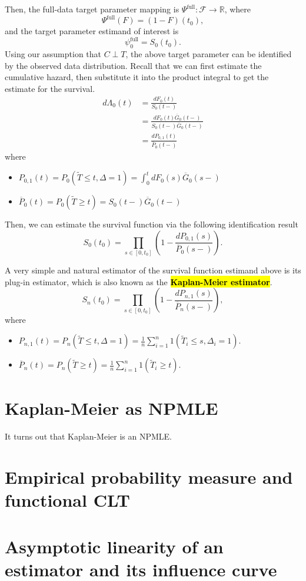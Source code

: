 \documentclass[12pt]{article}
\DeclareMathOperator{\1}{\mathds{1}}
\begin{document}
Then, the full-data target parameter mapping is $\Psi^\text{full}: \mathcal F \to \mathbb R$, where
\[
\Psi^\text{full}(F) = (1 - F)(t_0),
\]
and the target parameter estimand of interest is 
\[
\psi_0^\text{full} = S_0(t_0).
\]
Using our assumption that $C \perp T$, the above target parameter can be identified by the observed data distribution. Recall that we can first estimate the cumulative hazard, then substitute it into the product integral to get the estimate for the survival.
\begin{align*}
d\Lambda_0(t) &= \frac{dF_0(t)}{S_0(t-)} \\
&= \frac{dF_0(t) \overline G_0(t-)}{S_0(t-)\overline G_0(t-)} \\
&= \frac{dP_{0, 1}(t)}{\overline P_0(t-)}
\end{align*}
where
\begin{itemize}
	\item $P_{0, 1}(t) = P_0(\widetilde T \le t, \Delta = 1) = \int_0^t dF_0(s) \overline G_0(s-)$
	\item $\overline P_0(t) = P_0(\widetilde T \ge t) = S_0(t-)\overline G_0(t-)$
\end{itemize}

Then, we can estimate the survival function via the following identification result
\[
S_0(t_0) = \prod_{s \in [0, t_0]}\left(1 - \frac{dP_{0, 1}(s)}{\overline P_0(s-)}\right).
\]

A very simple and natural estimator of the survival function estimand above is its plug-in estimator, which is also known as the \hl{\textbf{Kaplan-Meier estimator}}.
\[
S_n(t_0) = \prod_{s \in [0, t_0]}\left(1 - \frac{dP_{n, 1}(s)}{\overline P_n(s-)}\right),
\]
where
\begin{itemize}
	\item $P_{n, 1}(t) = P_n(\widetilde T \le t, \Delta = 1) = \frac1n \sum_{i=1}^n 1(\widetilde T_i \le s, \Delta_i = 1)$.
	\item $\overline P_n(t) = P_n(\widetilde T \ge t) = \frac1n \sum_{i=1}^n 1(\widetilde T_i \ge t)$.
\end{itemize}

\section{Kaplan-Meier as NPMLE}
It turns out that Kaplan-Meier is an NPMLE. 



\section{Empirical probability measure and functional CLT}

\section{Asymptotic linearity of an estimator and its influence curve}
\end{document}
